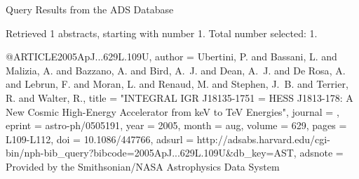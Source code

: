 Query Results from the ADS Database


Retrieved 1 abstracts, starting with number 1.  Total number selected: 1.

@ARTICLE{2005ApJ...629L.109U,
   author = {{Ubertini}, P. and {Bassani}, L. and {Malizia}, A. and {Bazzano}, A. and 
	{Bird}, A.~J. and {Dean}, A.~J. and {De Rosa}, A. and {Lebrun}, F. and 
	{Moran}, L. and {Renaud}, M. and {Stephen}, J.~B. and {Terrier}, R. and 
	{Walter}, R.},
    title = "{INTEGRAL IGR J18135-1751 = HESS J1813-178: A New Cosmic High-Energy Accelerator from keV to TeV Energies}",
  journal = {\apjl},
   eprint = {astro-ph/0505191},
     year = 2005,
    month = aug,
   volume = 629,
    pages = {L109-L112},
      doi = {10.1086/447766},
   adsurl = {http://adsabs.harvard.edu/cgi-bin/nph-bib_query?bibcode=2005ApJ...629L.109U&db_key=AST},
  adsnote = {Provided by the Smithsonian/NASA Astrophysics Data System}
}


